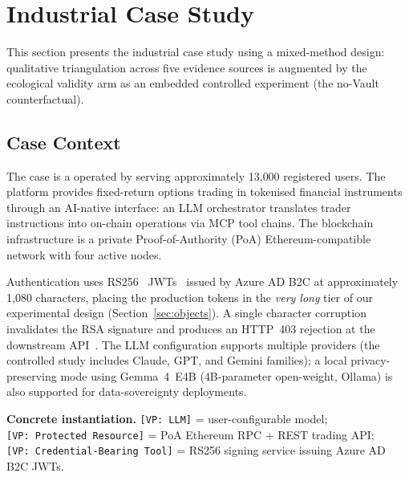 %

\section{Industrial Case Study}\label{sec:case_study}

This section presents the industrial case study using a mixed-method design: qualitative
triangulation across five evidence sources is augmented by the ecological
validity arm as an embedded controlled experiment (the no-Vault counterfactual).

\subsection{Case Context}\label{sec:case_context}


The case is a
operated by
serving approximately 13{,}000 registered users.
The platform provides fixed-return options trading in tokenised financial
instruments through an AI-native interface: an LLM orchestrator translates
trader instructions into on-chain operations via MCP tool chains. The
blockchain infrastructure is a private Proof-of-Authority (PoA) Ethereum-compatible
network with four active nodes.

Authentication uses RS256~\cite{rfc7518} JWTs~\cite{rfc7519} issued by Azure AD B2C at approximately
1{,}080 characters, placing the production tokens in the \emph{very long} tier
of our experimental design (Section~\ref{sec:objects}). A single character
corruption invalidates the RSA signature and produces an HTTP~403
rejection at the downstream API~\cite{rfc6750}. The LLM configuration supports multiple
providers (the controlled study includes Claude, GPT, and Gemini families);
a local privacy-preserving mode using Gemma~4~E4B (4B-parameter open-weight,
Ollama) is also supported for data-sovereignty deployments.

\textbf{Concrete instantiation.}
\texttt{[VP:~LLM]} = user-configurable model; \texttt{[VP:~Protected Resource]} = PoA
Ethereum RPC + REST trading API; \texttt{[VP:~Credential-Bearing Tool]} = RS256
signing service issuing Azure AD B2C JWTs.

